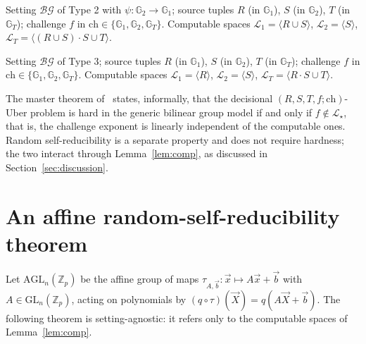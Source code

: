 \documentclass{conjura-solution}
\newcommand{\Gone}{\mathbb{G}_1}
\newcommand{\Gtwo}{\mathbb{G}_2}
\newcommand{\GT}{\mathbb{G}_T}
\newcommand{\Zp}{\mathbb{Z}_p}
\newcommand{\vx}{\vec{x}}
\newcommand{\vX}{\vec{X}}
\newcommand{\vb}{\vec{b}}
\newcommand{\LL}{\mathcal{L}}
\newcommand{\Span}[1]{\langle #1 \rangle} %
\newcommand{\GL}{\mathrm{GL}}
\newcommand{\AGL}{\mathrm{AGL}}
\newcommand{\bg}{\mathcal{BG}}
\newcommand{\ch}{\mathrm{ch}}
\begin{document}
\begin{definition}
Setting $\bg$ of Type 2 with $\psi\colon\Gtwo\to\Gone$; source tuples $R$ (in $\Gone$),
$S$ (in $\Gtwo$), $T$ (in $\GT$); challenge $f$ in $\ch\in\{\Gone,\Gtwo,\GT\}$. Computable
spaces $\LL_1=\Span{R\cup S}$, $\LL_2=\Span{S}$,
$\LL_T=\Span{(R\cup S)\cdot S\cup T}$.
\end{definition}

\begin{definition}
Setting $\bg$ of Type 3; source tuples $R$ (in $\Gone$), $S$ (in $\Gtwo$), $T$ (in $\GT$);
challenge $f$ in $\ch\in\{\Gone,\Gtwo,\GT\}$. Computable spaces $\LL_1=\Span{R}$,
$\LL_2=\Span{S}$, $\LL_T=\Span{R\cdot S\cup T}$.
\end{definition}

\begin{remark}[hardness]
The master theorem of~\cite{BBG05,Boyen08} states, informally, that the decisional
$(R,S,T,f;\ch)$-Uber problem is hard in the generic bilinear group model if and only if
$f\notin\LL_\star$, that is, the challenge exponent is linearly independent of the
computable ones. Random self-reducibility is a separate property and does not require
hardness; the two interact through Lemma~\ref{lem:comp}, as discussed in
Section~\ref{sec:discussion}.
\end{remark}

\section{An affine random-self-reducibility theorem}

Let $\AGL_n(\Zp)$ be the affine group of maps $\tau_{A,\vb}\colon\vx\mapsto A\vx+\vb$ with
$A\in\GL_n(\Zp)$, acting on polynomials by $(q\circ\tau)(\vX)=q(A\vX+\vb)$. The following
theorem is setting-agnostic: it refers only to the computable spaces of
Lemma~\ref{lem:comp}.
\end{document}
